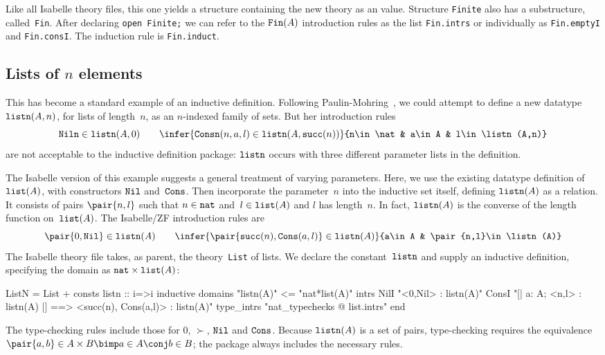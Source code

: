 Like all Isabelle theory files, this one yields a structure containing the
new theory as an \ML{} value.  Structure {\tt Finite} also has a
substructure, called~{\tt Fin}.  After declaring \hbox{\tt open Finite;} we
can refer to the $\hbox{\tt Fin}(A)$ introduction rules as the list {\tt Fin.intrs}
or individually as {\tt Fin.emptyI} and {\tt Fin.consI}.  The induction
rule is {\tt Fin.induct}.


\subsection{Lists of $n$ elements}\label{listn-sec}
This has become a standard example of an inductive definition.  Following
Paulin-Mohring~\cite{paulin92}, we could attempt to define a new datatype
$\hbox{\tt listn}(A,n)$, for lists of length~$n$, as an $n$-indexed family of sets.
But her introduction rules
\[ \hbox{\tt Niln}\in\listn(A,0)  \qquad
   \infer{\hbox{\tt Consn}(n,a,l)\in\listn(A,\succ(n))}
         {n\in\nat & a\in A & l\in\listn(A,n)}
\]
are not acceptable to the inductive definition package:
$\hbox{\tt listn}$ occurs with three different parameter lists in the definition.

The Isabelle version of this example suggests a general treatment of
varying parameters.  Here, we use the existing datatype definition of
$\hbox{\tt list}(A)$, with constructors $\hbox{\tt Nil}$ and~$\hbox{\tt Cons}$.  Then incorporate the
parameter~$n$ into the inductive set itself, defining $\hbox{\tt listn}(A)$ as a
relation.  It consists of pairs $\pair{n,l}$ such that $n\in\hbox{\tt nat}$
and~$l\in\hbox{\tt list}(A)$ and $l$ has length~$n$.  In fact, $\hbox{\tt listn}(A)$ is the
converse of the length function on~$\hbox{\tt list}(A)$.  The Isabelle/ZF introduction
rules are
\[ \pair{0,\Nil}\in\listn(A)  \qquad
   \infer{\pair{\succ(n),\Cons(a,l)}\in\listn(A)}
         {a\in A & \pair{n,l}\in\listn(A)}
\]
The Isabelle theory file takes, as parent, the theory~{\tt List} of lists.
We declare the constant~$\hbox{\tt listn}$ and supply an inductive definition,
specifying the domain as $\hbox{\tt nat}\times\hbox{\tt list}(A)$:
\begin{ttbox}
ListN = List +
consts  listn :: i=>i
inductive
  domains   "listn(A)" <= "nat*list(A)"
  intrs
    NilI  "<0,Nil> : listn(A)"
    ConsI "[| a: A;  <n,l> : listn(A) |] ==> <succ(n), Cons(a,l)> : listn(A)"
  type_intrs "nat_typechecks @ list.intrs"
end
\end{ttbox}
The type-checking rules include those for 0, $\succ$, $\hbox{\tt Nil}$ and $\hbox{\tt Cons}$.
Because $\hbox{\tt listn}(A)$ is a set of pairs, type-checking requires the
equivalence $\pair{a,b}\in A\times B \bimp a\in A \conj b\in B$; the
package always includes the necessary rules.

